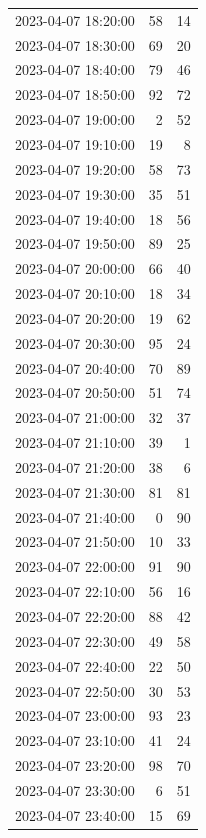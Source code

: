 \documentclass[
  letterpaper,
  DIV=11,
  numbers=noendperiod]{scrartcl}
\begin{document}
\begin{tabular}{lrr}
2023-04-07 18:20:00 &    58 &    14 \\
2023-04-07 18:30:00 &    69 &    20 \\
2023-04-07 18:40:00 &    79 &    46 \\
2023-04-07 18:50:00 &    92 &    72 \\
2023-04-07 19:00:00 &     2 &    52 \\
2023-04-07 19:10:00 &    19 &     8 \\
2023-04-07 19:20:00 &    58 &    73 \\
2023-04-07 19:30:00 &    35 &    51 \\
2023-04-07 19:40:00 &    18 &    56 \\
2023-04-07 19:50:00 &    89 &    25 \\
2023-04-07 20:00:00 &    66 &    40 \\
2023-04-07 20:10:00 &    18 &    34 \\
2023-04-07 20:20:00 &    19 &    62 \\
2023-04-07 20:30:00 &    95 &    24 \\
2023-04-07 20:40:00 &    70 &    89 \\
2023-04-07 20:50:00 &    51 &    74 \\
2023-04-07 21:00:00 &    32 &    37 \\
2023-04-07 21:10:00 &    39 &     1 \\
2023-04-07 21:20:00 &    38 &     6 \\
2023-04-07 21:30:00 &    81 &    81 \\
2023-04-07 21:40:00 &     0 &    90 \\
2023-04-07 21:50:00 &    10 &    33 \\
2023-04-07 22:00:00 &    91 &    90 \\
2023-04-07 22:10:00 &    56 &    16 \\
2023-04-07 22:20:00 &    88 &    42 \\
2023-04-07 22:30:00 &    49 &    58 \\
2023-04-07 22:40:00 &    22 &    50 \\
2023-04-07 22:50:00 &    30 &    53 \\
2023-04-07 23:00:00 &    93 &    23 \\
2023-04-07 23:10:00 &    41 &    24 \\
2023-04-07 23:20:00 &    98 &    70 \\
2023-04-07 23:30:00 &     6 &    51 \\
2023-04-07 23:40:00 &    15 &    69 \\

\end{tabular}
\end{document}
